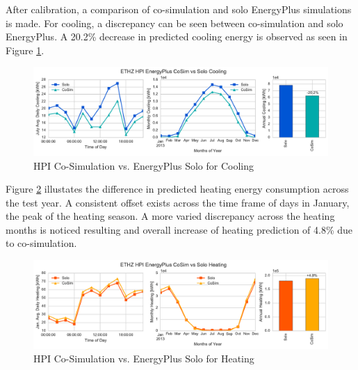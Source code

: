 \documentclass{tBPS2e}
\theoremstyle{plain}
\theoremstyle{definition}
\theoremstyle{remark}
\begin{document}
After calibration, a comparison of co-simulation and solo EnergyPlus simulations is made. For cooling, a discrepancy can be seen between co-simulation and solo EnergyPlus. A 20.2\% decrease in predicted cooling energy is observed as seen in Figure \ref{fig:hpi_energypluscooling}.

\begin{figure}[H]
\centering
\includegraphics[scale=0.55]{figures/HPI_EnergyPlus_Cooling}
\caption{HPI Co-Simulation vs. EnergyPlus Solo for Cooling}
\label{fig:hpi_energypluscooling}
\end{figure}


Figure \ref{fig:hpi_energyplusheating} illustates the difference in predicted heating energy consumption across the test year. A consistent offset exists across the time frame of days in January, the peak of the heating season. A more varied discrepancy across the heating months is noticed resulting and overall increase of heating prediction of 4.8\% due to co-simulation. 

\begin{figure}[H]
\centering
\includegraphics[scale=0.55]{figures/HPI_EnergyPlus_Heating}
\caption{HPI Co-Simulation vs. EnergyPlus Solo for Heating}
\label{fig:hpi_energyplusheating}
\end{figure}




\end{document}
